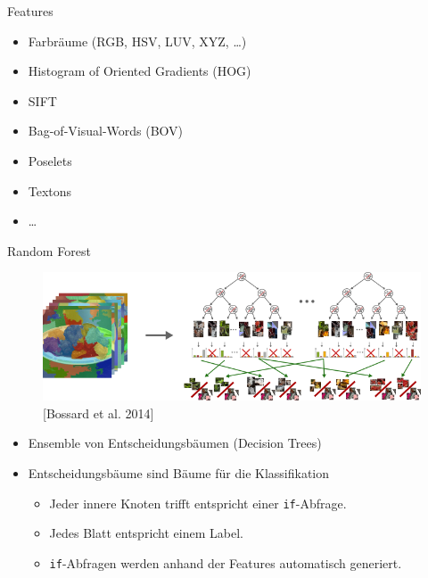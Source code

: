 \begin{frame}{Features}
    \begin{itemize}
        \item Farbräume (RGB, HSV, LUV, XYZ, \dots)
        \item Histogram of Oriented Gradients (HOG)
        \item SIFT
        \item Bag-of-Visual-Words (BOV)
        \item Poselets
        \item Textons
        \item \dots
    \end{itemize}
\end{frame}

\begin{frame}{Random Forest}
    \begin{figure}[ht]
        \centering
        \includegraphics[width=\textwidth]{../images/rf-comp-mining.png}
        \caption{[Bossard et al. 2014]}
        \label{fig:input}
    \end{figure}

    \begin{itemize}[<+->]
        \item Ensemble von Entscheidungsbäumen (Decision Trees)
        \item Entscheidungsbäume sind Bäume für die Klassifikation
        \begin{itemize}
            \item Jeder innere Knoten trifft entspricht einer \texttt{if}-Abfrage.
            \item Jedes Blatt entspricht einem Label.
            \item \texttt{if}-Abfragen werden anhand der Features automatisch
                  generiert.
        \end{itemize}
    \end{itemize}
\end{frame}

